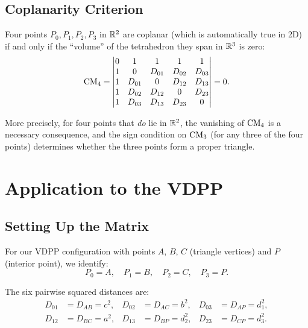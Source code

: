 \subsection{Coplanarity Criterion}

\begin{corollary}
\label{cor:coplanarity}
Four points $P_0, P_1, P_2, P_3$ in $\mathbb{R}^2$ are coplanar (which is automatically true in 2D) if and only if the ``volume'' of the tetrahedron they span in $\mathbb{R}^3$ is zero:
\begin{equation}
\label{eq:coplanar}
\mathrm{CM}_4 = \begin{vmatrix}
0 & 1 & 1 & 1 & 1 \\
1 & 0 & D_{01} & D_{02} & D_{03} \\
1 & D_{01} & 0 & D_{12} & D_{13} \\
1 & D_{02} & D_{12} & 0 & D_{23} \\
1 & D_{03} & D_{13} & D_{23} & 0
\end{vmatrix} = 0.
\end{equation}
\end{corollary}

More precisely, for four points that \emph{do} lie in $\mathbb{R}^2$, the vanishing of $\mathrm{CM}_4$ is a necessary consequence, and the sign condition on $\mathrm{CM}_3$ (for any three of the four points) determines whether the three points form a proper triangle.

\section{Application to the VDPP}

\subsection{Setting Up the Matrix}

For our VDPP configuration with points $A$, $B$, $C$ (triangle vertices) and $P$ (interior point), we identify:
\begin{equation}
P_0 = A, \quad P_1 = B, \quad P_2 = C, \quad P_3 = P.
\end{equation}

The six pairwise squared distances are:
\begin{align}
D_{01} &= D_{AB} = c^2, & D_{02} &= D_{AC} = b^2, & D_{03} &= D_{AP} = d_1^2, \\
D_{12} &= D_{BC} = a^2, & D_{13} &= D_{BP} = d_2^2, & D_{23} &= D_{CP} = d_3^2.
\end{align}

